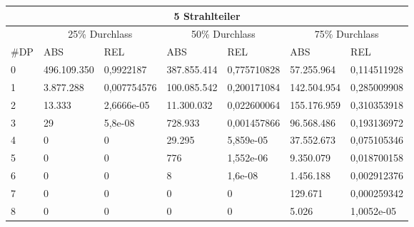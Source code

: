 \begin{tabular}{|l|l|l|l|l|l|l|}
	\hline
	\multicolumn{7}{|c|}{5 Strahlteiler} \\\hline
	&\multicolumn{2}{|c|}{25\% Durchlass}&\multicolumn{2}{c|}{50\% Durchlass}&\multicolumn{2}{c|}{75\% Durchlass}\\\hline
	\#DP & ABS & REL  & ABS & REL & ABS & REL \\\hline
	0&496.109.350&0,9922187&387.855.414&0,775710828&57.255.964&0,114511928\\
	1&3.877.288&0,007754576&100.085.542&0,200171084&142.504.954&0,285009908\\
	2&13.333&2,6666e-05&11.300.032&0,022600064&155.176.959&0,310353918\\
	3&29&5,8e-08&728.933&0,001457866&96.568.486&0,193136972\\
	4&0&0&29.295&5,859e-05&37.552.673&0,075105346\\
	5&0&0&776&1,552e-06&9.350.079&0,018700158\\
	6&0&0&8&1,6e-08&1.456.188&0,002912376\\
	7&0&0&0&0&129.671&0,000259342\\
	8&0&0&0&0&5.026&1,0052e-05\\
	\hline
\end{tabular}
